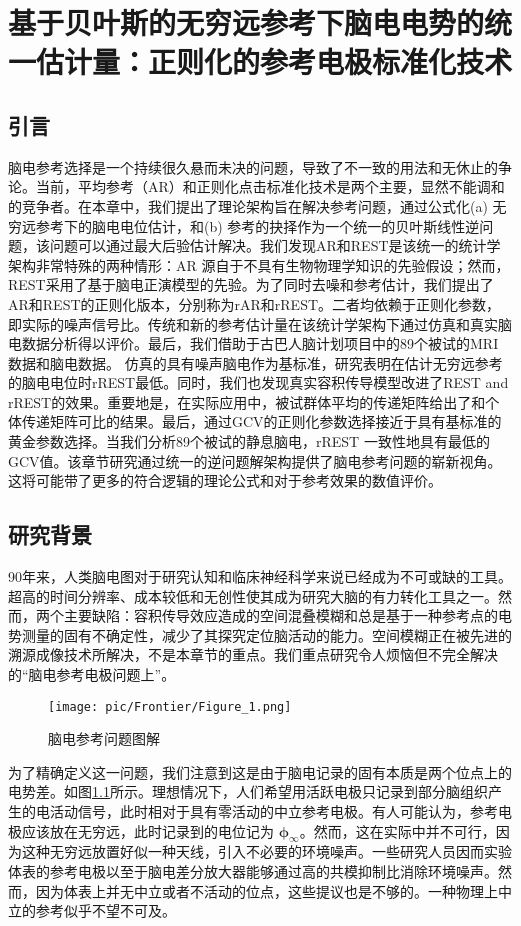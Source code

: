 \chapter{基于贝叶斯的无穷远参考下脑电电势的统一估计量：正则化的参考电极标准化技术}
\section{引言}
脑电参考选择是一个持续很久悬而未决的问题，导致了不一致的用法和无休止的争论。当前，平均参考（AR）和正则化点击标准化技术是两个主要，显然不能调和的竞争者。在本章中，我们提出了理论架构旨在解决参考问题，通过公式化(a) 无穷远参考下的脑电电位估计，和(b) 参考的抉择作为一个统一的贝叶斯线性逆问题，该问题可以通过最大后验估计解决。我们发现AR和REST是该统一的统计学架构非常特殊的两种情形：AR 源自于不具有生物物理学知识的先验假设；然而，REST采用了基于脑电正演模型的先验。为了同时去噪和参考估计，我们提出了AR和REST的正则化版本，分别称为rAR和rREST。二者均依赖于正则化参数，即实际的噪声信号比。传统和新的参考估计量在该统计学架构下通过仿真和真实脑电数据分析得以评价。最后，我们借助于古巴人脑计划项目中的89个被试的MRI数据和脑电数据。 仿真的具有噪声脑电作为基标准，研究表明在估计无穷远参考的脑电电位时rREST最低。同时，我们也发现真实容积传导模型改进了REST and rREST的效果。重要地是，在实际应用中，被试群体平均的传递矩阵给出了和个体传递矩阵可比的结果。最后，通过GCV的正则化参数选择接近于具有基标准的黄金参数选择。当我们分析89个被试的静息脑电，rREST 一致性地具有最低的GCV值。该章节研究通过统一的逆问题解架构提供了脑电参考问题的崭新视角。 这将可能带了更多的符合逻辑的理论公式和对于参考效果的数值评价。
\section{研究背景}
90年来，人类脑电图对于研究认知和临床神经科学来说已经成为不可或缺的工具。超高的时间分辨率、成本较低和无创性使其成为研究大脑的有力转化工具之一。然而，两个主要缺陷：容积传导效应造成的空间混叠模糊和总是基于一种参考点的电势测量的固有不确定性，减少了其探究定位脑活动的能力。空间模糊正在被先进的溯源成像技术所解决，不是本章节的重点。我们重点研究令人烦恼但不完全解决的“脑电参考电极问题上”。
\begin{figure}[!ht]
	\centering
	\texttt{[image: pic/Frontier/Figure\_1.png]}
	\caption{脑电参考问题图解}
	\label{3.1}
\end{figure}
为了精确定义这一问题，我们注意到这是由于脑电记录的固有本质是两个位点上的电势差。如图\ref{3.1}所示。理想情况下，人们希望用活跃电极只记录到部分脑组织产生的电活动信号，此时相对于具有零活动的中立参考电极。有人可能认为，参考电极应该放在无穷远，此时记录到的电位记为 $\mathbf{\phi}_{\infty}$。然而，这在实际中并不可行，因为这种无穷远放置好似一种天线，引入不必要的环境噪声。一些研究人员因而实验体表的参考电极以至于脑电差分放大器能够通过高的共模抑制比消除环境噪声。然而，因为体表上并无中立或者不活动的位点，这些提议也是不够的。一种物理上中立的参考似乎不望不可及。

